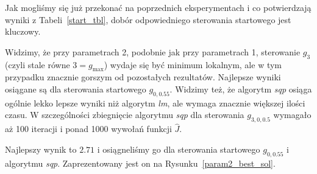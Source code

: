 \documentclass[11pt]{article}
\begin{document}
Jak mogliśmy się już przekonać na poprzednich eksperymentach i co potwierdzają wyniki z Tabeli~\ref{start_tbl}, dobór odpowiedniego sterowania startowego jest kluczowy.

Widzimy, że przy parametrach 2, podobnie jak przy parametrach 1, sterowanie $g_3$ (czyli stale równe $3 = g_{\max}$) wydaje się być minimum lokalnym, ale w tym przypadku znacznie gorszym od pozostałych rezultatów. Najlepsze wyniki osiągane są dla sterowania startowego $g_{0,0.55}$. Widzimy też, że algorytm {\it sqp\/} osiąga ogólnie lekko lepsze wyniki niż algorytm {\it lm}, ale wymaga znacznie większej ilości czasu. W szczególności zbiegnięcie algorytmu {\it sqp\/} dla sterowania $g_{3,0,0.5}$ wymagało aż 100 iteracji i ponad 1000 wywołań funkcji $\hat{J}$.

Najlepszy wynik to $2.71$ i osiągneliśmy go dla sterowania startowego $g_{0,0.55}$ i algorytmu {\it sqp}. Zaprezentowany jest on na Rysunku~\ref{param2_best_sol}.
\end{document}

